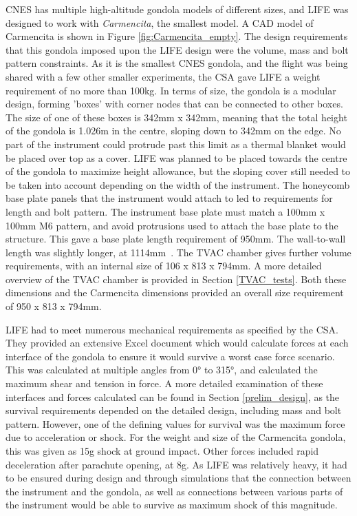 CNES has multiple high-altitude gondola models of different sizes, and LIFE was designed to work with \textit{Carmencita}, the smallest model. A CAD model of Carmencita is shown in Figure \ref{fig:Carmencita_empty}. The design requirements that this gondola imposed upon the LIFE design were the volume, mass and bolt pattern constraints. As it is the smallest CNES gondola, and the flight was being shared with a few other smaller experiments, the CSA gave LIFE a weight requirement of no more than 100kg. In terms of size, the gondola is a modular design, forming 'boxes' with corner nodes that can be connected to other boxes. The size of one of these boxes is 342mm x 342mm, meaning that the total height of the gondola is 1.026m in the centre, sloping down to 342mm on the edge. No part of the instrument could protrude past this limit as a thermal blanket would be placed over top as a cover. LIFE was planned to be placed towards the centre of the gondola to maximize height allowance, but the sloping cover still needed to be taken into account depending on the width of the instrument. The honeycomb base plate panels that the instrument would attach to led to requirements for length and bolt pattern. The instrument base plate must match a 100mm x 100mm M6 pattern, and avoid protrusions used to attach the base plate to the structure. This gave a base plate length requirement of 950mm. The wall-to-wall length was slightly longer, at 1114mm~\citep{STRATOS_CARMENCITA_doc}. The TVAC chamber gives further volume requirements, with an internal size of 106 x 813 x 794mm. A more detailed overview of the TVAC chamber is provided in Section \ref{TVAC_tests}. Both these dimensions and the Carmencita dimensions provided an overall size requirement of 950 x 813 x 794mm. 

LIFE had to meet numerous mechanical requirements as specified by the CSA. They provided an extensive Excel document which would calculate forces at each interface of the gondola to ensure it would survive a worst case force scenario. This was calculated at multiple angles from 0° to 315°, and calculated the maximum shear and tension in force. A more detailed examination of these interfaces and forces calculated can be found in Section \ref{prelim_design}, as the survival requirements depended on the detailed design, including mass and bolt pattern. However, one of the defining values for survival was the maximum force due to acceleration or shock. For the weight and size of the Carmencita gondola, this was given as 15g shock at ground impact. Other forces included rapid deceleration after parachute opening, at 8g. As LIFE was relatively heavy, it had to be ensured during design and through simulations that the connection between the instrument and the gondola, as well as connections between various parts of the instrument would be able to survive as maximum shock of this magnitude.

